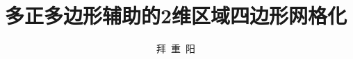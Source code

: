 \documentclass[bachelor,twoside,openright]{ustcthesis}
\title{多正多边形辅助的2维区域四边形网格化}%
\author{拜\ 重\ 阳}
\begin{document}
  \maketitle

\frontmatter
\makeatletter
\ifustc@bachelor
	
	
	\tableofcontents

	\ustclot
	\ustclof
	\ustcloa
	
\else
	\tableofcontents

	
\fi
\makeatother

\mainmatter
  
  
  
  
  

\backmatter
\end{document}
